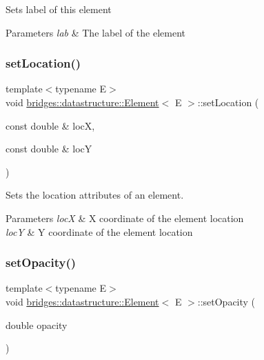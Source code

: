 Sets label of this element


\begin{DoxyParams}{Parameters}
{\em lab} & The label of the element \\
\hline
\end{DoxyParams}
\mbox{\label{classbridges_1_1datastructure_1_1_element_af3af017c9d6efcbc2124d0231b57e7a6}} 
\subsubsection{\texorpdfstring{setLocation()}{setLocation()}}
{\footnotesize\ttfamily template$<$typename E$>$ \\
void \mbox{\hyperlink{classbridges_1_1datastructure_1_1_element}{bridges\+::datastructure\+::\+Element}}$<$ E $>$\+::set\+Location (\begin{DoxyParamCaption}\item[{const double \&}]{locX,  }\item[{const double \&}]{locY }\end{DoxyParamCaption})\hspace{0.3cm}{\ttfamily [inline]}}

Sets the location attributes of an element.


\begin{DoxyParams}{Parameters}
{\em locX} & X coordinate of the element location \\
\hline
{\em locY} & Y coordinate of the element location \\
\hline
\end{DoxyParams}
\mbox{\label{classbridges_1_1datastructure_1_1_element_acb5d0b5734a6b3c17b7b1784ae1dc79c}} 
\subsubsection{\texorpdfstring{setOpacity()}{setOpacity()}}
{\footnotesize\ttfamily template$<$typename E$>$ \\
void \mbox{\hyperlink{classbridges_1_1datastructure_1_1_element}{bridges\+::datastructure\+::\+Element}}$<$ E $>$\+::set\+Opacity (\begin{DoxyParamCaption}\item[{double}]{opacity }\end{DoxyParamCaption})\hspace{0.3cm}{\ttfamily [inline]}}

